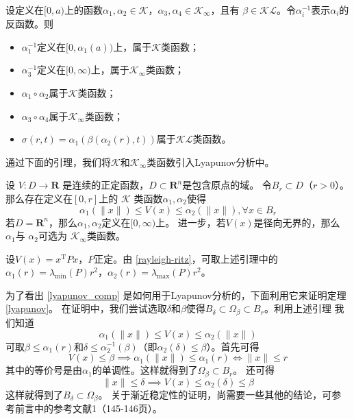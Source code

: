 \begin{lemma}
  设定义在$[0,a)$上的函数$\alpha_{1},\alpha_{2}\in\mathcal{K}$，$\alpha_{3},\alpha_{4}\in\mathcal{K}_{\infty}$，且有
  $\beta\in\mathcal{KL}$。令$\alpha_{i}^{-1}$表示$\alpha_{i}$的反函数。则
  \begin{itemize}[leftmargin=1em]
    \item $\alpha_{1}^{-1}$定义在$[0,\alpha_{1}(a))$上，属于$\mathcal{K}$类函数；
    \item $\alpha_{3}^{-1}$定义在$[0,\infty)$上，属于$\mathcal{K}_\infty$类函数；
    \item $\alpha_{1} \circ\alpha_{2}$属于$\mathcal{K}$类函数；
    \item $\alpha_{3} \circ\alpha_{4}$属于$\mathcal{K}_\infty$类函数；
    \item $\sigma(r,t)=\alpha_{1}(\beta(\alpha_{2}(r),t)) $属于$\mathcal{K}\mathcal{L}$类函数。
  \end{itemize}
\end{lemma}

通过下面的引理，我们将$\mathcal{K}$和$\mathcal{K}_\infty$类函数引入Lyapunov分析中。

\begin{lemma}\label{lyapunov_comp}
 设 $V : D \rightarrow \mathbf{R}$ 是连续的正定函数，$D\subset\mathbf{R}^n$是包含原点的域。
  令$B_r\subset D$（$r>0$）。那么存在定义在$[0,r]$上的
  $\mathcal{K}$ 类函数$\alpha_1,\alpha_2$使得
  \[ \alpha_1 (\| x \|) \leq V (x) \leq \alpha_2 (\| x \|), \forall x \in B_r \]
  若$D =\mathbf{R}^n$，那么$\alpha_1,\alpha_2$定义在$[0,\infty)$上。
  进一步，若$V(x)$是径向无界的，那么 $\alpha_1$与 $\alpha_2$可选为 $\mathcal{K}_{\infty}$类函数。
\end{lemma}

\begin{example}
  设$V (x) = x^\mathrm{T} P  x$，$P$正定。由 \ref{rayleigh-ritz}，可取上述引理中的$\alpha_1(r)=\lambda_{\min} (P)r^2$，$\alpha_2(r)=\lambda_{\max} (P)r^2$。
\end{example}
为了看出 \ref{lyapunov_comp} 是如何用于Lyapunov分析的，下面利用它来证明定理 \ref{lyapunov}。
在证明中，我们尝试选取$\delta$和$\beta$使得$B_\delta\subset\Omega_\beta\subset B_r$。利用上述引理
我们知道\[\alpha_1 (\| x \|) \leq V (x) \leq \alpha_2 (\| x \|)\]
可取$\beta\le\alpha_1(r)$和$\delta\le\alpha_2^{-1}(\beta)$（即$\alpha_2(\delta)\le\beta$）。首先可得
\[V(x)\le\beta\implies\alpha_1(\|x\|)\le\alpha_1(r)\iff \|x\|\le r\]
其中的等价号是由$\alpha_1$的单调性。这样就得到了$\Omega_\beta\subset B_r$。
还可得\[\|x\|\le\delta\implies V(x)\le\alpha_2(\delta)\le\beta\]
这样就得到了$B_\delta\subset\Omega_\beta$。
关于渐近稳定性的证明，尚需要一些其他的结论，可参考前言中的参考文献1（145-146页）。

